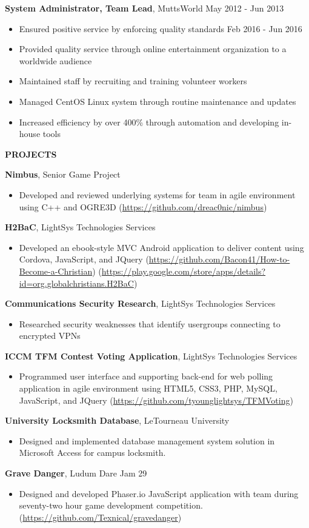 \documentclass[letterpaper]{article}
\newcommand{\altsection}[1]{\noindent\textbf{#1}\smallskip}
\newcommand{\entry}[3]{\textbf{#1}, #2\begin{itemize}[leftmargin=3.5em]#3\end{itemize}\bigskip}
\begin{document}
\entry{System Administrator, Team Lead}{MuttsWorld                             \hfill          May 2012 - Jun 2013}  {
    \item Ensured positive service by enforcing quality standards       \hfill          Feb 2016 - Jun 2016
    \item Provided quality service through online entertainment organization to a worldwide audience
    \item Maintained staff by recruiting and training volunteer workers
    \item Managed CentOS Linux system through routine maintenance and updates
    \item Increased efficiency by over 400\% through automation and developing in-house tools
}

\altsection{PROJECTS}

\entry{Nimbus}{Senior Game Project} {
    \item Developed and reviewed underlying systems for team in agile environment using C++ and OGRE3D (\url{https://github.com/dreac0nic/nimbus})
}

\entry{H2BaC}{LightSys Technologies Services} {
    \item Developed an ebook-style MVC Android application to deliver content using Cordova, JavaScript, and JQuery (\url{https://github.com/Bacon41/How-to-Become-a-Christian}) (\url{https://play.google.com/store/apps/details?id=org.globalchristians.H2BaC})
}

\entry{Communications Security Research}{LightSys Technologies Services}{
    \item Researched security weaknesses that identify usergroups connecting to encrypted VPNs
}

\entry{ICCM TFM Contest Voting Application}{LightSys Technologies Services} {
    \item Programmed user interface and supporting back-end for web polling application in agile environment using HTML5, CSS3, PHP, MySQL, JavaScript, and JQuery (\url{https://github.com/tyounglightsys/TFMVoting})
}

\entry{University Locksmith Database}{LeTourneau University} {
    \item Designed and implemented database management system solution in Microsoft Access for campus locksmith.
}

\entry{Grave Danger}{Ludum Dare Jam 29} {
    \item Designed and developed Phaser.io JavaScript application with team during seventy-two hour game development competition. (\url{https://github.com/Texnical/gravedanger})
}
\end{document}
